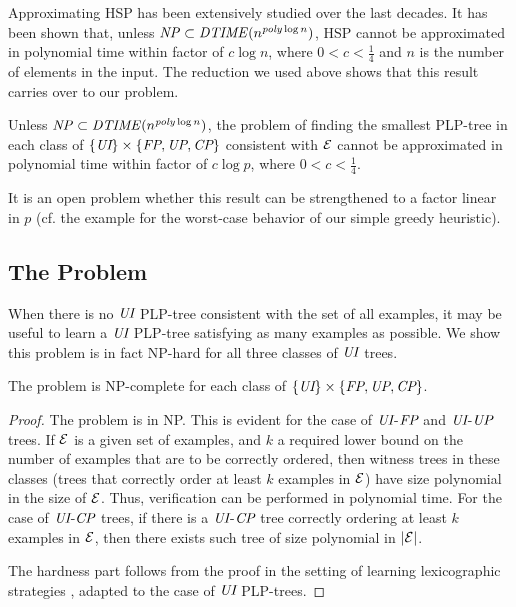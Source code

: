 Approximating HSP has been extensively studied over the last decades.
It has been shown \cite{lund1994hardness} that, unless $\mathit{NP} \subset \mathit{DTIME}(n^{\mathit{poly} \log n})$,
HSP cannot be approximated 
in polynomial time within factor of $c \log n$, where $0<c<\frac{1}{4}$ and
$n$ is the number of elements in the input. The reduction we used above
shows that this result
carries over to our problem.
\begin{thm}
\label{thm:UI_smallest_approx}
	Unless $\mathit{NP} \subset \mathit{DTIME}(n^{\mathit{poly} \log n})$,
	the problem of finding the smallest PLP-tree in each class of $\{\textit{UI}\} \times \{\textit{FP},\textit{UP},\textit{CP}\}$ 
	consistent with $\mathcal{E}$ cannot be approximated 
	in polynomial time within factor of $c \log p$, where $0<c<\frac{1}{4}$.
\end{thm}
It is an open problem whether this result can be strengthened to a factor 
linear in $p$ (cf. the example for the worst-case behavior of our simple 
greedy heuristic).


\vspace{-0.1cm}
\subsection{The  Problem}

\vspace{-0.1cm}
When there is no $\textit{UI}$ PLP-tree consistent with the set of all examples,
it may be useful to learn a $\textit{UI}$ PLP-tree satisfying as many examples 
as possible. We show this problem is in fact NP-hard for all three 
classes of $\textit{UI}$ trees.

\begin{thm}
\label{thm:UIFP_least_decision}
The  problem is NP-complete for each class of $\{\textit{UI}\} \times \{\textit{FP},\textit{UP},\textit{CP}\}$.
\end{thm}
\begin{proof}
The problem is in NP. This is evident for the case
of $\textit{UI}$-$\textit{FP}$ and $\textit{UI}$-$\textit{UP}$ trees. If $\mathcal{E}$ is a given set of examples,
and $k$ a required lower bound on the number of examples that are to be 
correctly ordered, then witness trees in these classes (trees that correctly 
order at least $k$ examples in $\mathcal{E}$) have size polynomial in the size of 
$\mathcal{E}$. Thus, verification can be performed in polynomial time. 
For the case of $\textit{UI}$-$\textit{CP}$ trees, if there is a $\textit{UI}$-$\textit{CP}$
tree correctly ordering at least $k$ examples in $\mathcal{E}$, then there exists
such tree of size polynomial in $|\mathcal{E}|$.

The hardness part follows from the proof in the setting of learning 
lexicographic strategies \cite{schmitt2006complexity}, adapted to the case 
of $\textit{UI}$ PLP-trees.
\end{proof}

